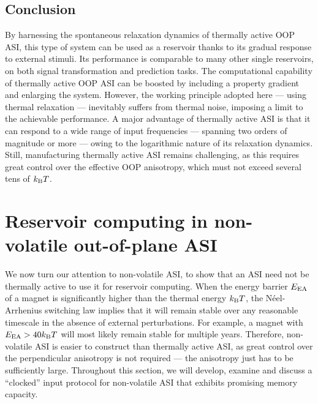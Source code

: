 \subsection{Conclusion}
By harnessing the spontaneous relaxation dynamics of thermally active OOP ASI, this type of system can be used as a reservoir thanks to its gradual response to external stimuli.
Its performance is comparable to many other single reservoirs, on both signal transformation and prediction tasks.
The computational capability of thermally active OOP ASI can be boosted by including a property gradient and enlarging the system.
However, the working principle adopted here --- using thermal relaxation --- inevitably suffers from thermal noise, imposing a limit to the achievable performance.
A major advantage of thermally active ASI is that it can respond to a wide range of input frequencies --- spanning two orders of magnitude or more --- owing to the logarithmic nature of its relaxation dynamics.
Still, manufacturing thermally active ASI remains challenging, as this requires great control over the effective OOP anisotropy, which must not exceed several tens of $\kBT$.


\newpage
\section{Reservoir computing in non-volatile out-of-plane ASI}
We now turn our attention to non-volatile ASI, to show that an ASI need not be thermally active to use it for reservoir computing.
When the energy barrier $E_\mathrm{EA}$ of a magnet is significantly higher than the thermal energy $\kBT$, the N\'eel-Arrhenius switching law implies that it will remain stable over any reasonable timescale in the absence of external perturbations.
For example, a magnet with $\EEA > 40 \kBT$ will most likely remain stable for multiple years.
Therefore, non-volatile ASI is easier to construct than thermally active ASI, as great control over the perpendicular anisotropy is not required --- the anisotropy just has to be sufficiently large.
Throughout this section, we will develop, examine and discuss a ``clocked'' input protocol for non-volatile ASI that exhibits promising memory capacity.

